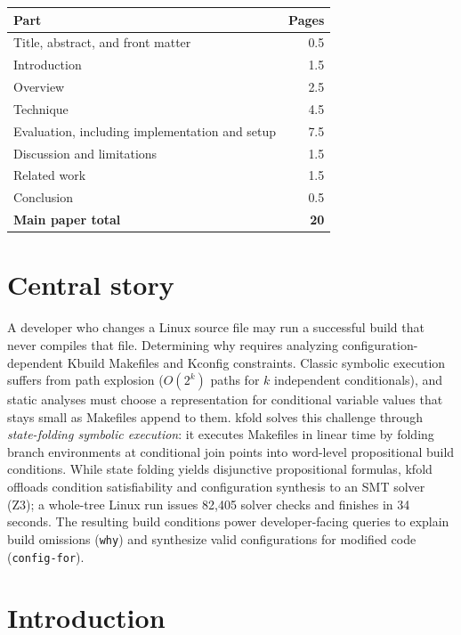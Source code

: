 \documentclass[acmsmall]{acmart}
\newcommand{\tool}{\textsf{kfold}\xspace}
\begin{document}
\begin{center}
\small
\begin{tabular}{@{}lr@{}}
\toprule
Part & Pages \\
\midrule

Title, abstract, and front matter & 0.5 \\
Introduction & 1.5 \\
Overview & 2.5 \\
Technique & 4.5 \\
Evaluation, including implementation and setup & 7.5 \\
Discussion and limitations & 1.5 \\
Related work & 1.5 \\
Conclusion & 0.5 \\
\textbf{Main paper total} & \textbf{20} \\
\bottomrule
\end{tabular}
\end{center}

\section*{Central story}\label{central-story}

A developer who changes a Linux source file may run a successful build that never compiles that file.
Determining why requires analyzing configuration-dependent Kbuild Makefiles and Kconfig constraints.
Classic symbolic execution suffers from path explosion ($O(2^k)$ paths for $k$ independent conditionals), and static analyses must choose a representation for conditional variable values that stays small as Makefiles append to them.
\tool solves this challenge through \emph{state-folding symbolic execution}: it executes Makefiles in linear time by folding branch environments at conditional join points into word-level propositional build conditions.
While state folding yields disjunctive propositional formulas, \tool offloads condition satisfiability and configuration synthesis to an SMT solver (Z3); a whole-tree Linux run issues 82,405 solver checks and finishes in 34 seconds.
The resulting build conditions power developer-facing queries to explain build omissions (\texttt{why}) and synthesize valid configurations for modified code (\texttt{config-for}).

\section{Introduction}\label{sec:introduction}
\end{document}
